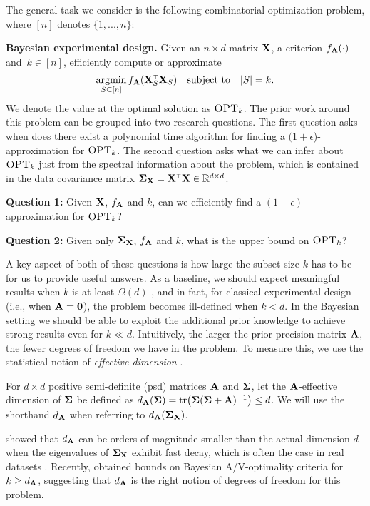 \documentclass[thesis.tex]{subfiles}
\begin{document}
The general task we consider is the following combinatorial
optimization problem, where $[n]$
denotes $\{1,...,n\}$:

\textbf{Bayesian experimental design.}
Given an $n\times d$ matrix $\mathbf X$,
a criterion $f_{\mathbf A}(\cdot)$ and~$k\in[n]$,
efficiently compute or approximate
\begin{align*}
\argmin_{S \subseteq [n]} f_{\A}(\X_S^\top\X_S)\quad\text{subject
  to}\quad |S|=k.
\end{align*}
We denote the value at the optimal solution as ${\textsc{OPT}_k}$.
The prior work around this problem can be grouped into two research questions.
The first question asks when does there exist a
polynomial time algorithm for finding a $(1+\epsilon$)-approximation
for ${\textsc{OPT}_k}$.
The second question asks what we can
infer about ${\textsc{OPT}_k}$ just from the spectral
information about the problem, which is contained in the data covariance matrix
$\Sigmab_\X=\X^\top\X\in\R^{d\times d}$.


\textbf{Question 1:} \quad
Given $\mathbf X$, $f_{\mathbf A}$ and $k$, can we efficiently find a $(1+\epsilon)$-approximation for
${\textsc{OPT}_k}$?

\textbf{Question 2:} \quad
Given only $\mathbf{\Sigma}_{\mathbf X}$, $f_{\mathbf A}$ and $k$,
what is the upper bound on ${\textsc{OPT}_k}$?


A key aspect of both of these questions is how large the subset
size $k$ has to be for us to provide useful answers. As a baseline, we
should expect meaningful results when $k$ is at least $\Omega(d)$ \citep[see
discussion in][]{near-optimal-design}, and in fact,
for classical experimental design (i.e., when $\mathbf A=\mathbf 0$), the problem
becomes ill-defined 
when $k<d$. In the Bayesian setting we should be able to exploit the
additional prior knowledge 
to achieve strong results even for $k\ll d$. Intuitively, the larger
the prior precision matrix $\mathbf A$, the fewer degrees of freedom we have
in the problem. To measure this, we use the statistical notion of
\emph{effective dimension} \citep{ridge-leverage-scores}.
\begin{definition}
For $d\times d$ positive semi-definite (psd) matrices $\mathbf A$ and $\mathbf{\Sigma}$,
  let the $\mathbf A$-effective dimension of $\mathbf{\Sigma}$
be defined as $d_{\mathbf A}(\mathbf{\Sigma}) =
\mathrm{tr}\big(\mathbf{\Sigma}(\mathbf{\Sigma}+\mathbf A)^{-1}\big) \leq d$.
We will use the shorthand $d_{\mathbf A}$ when referring to $d_{\mathbf A}(\mathbf{\Sigma}_{\mathbf X})$.
\end{definition}
\cite{klivans-goel17} showed that $d_\mathbf A$ can be orders of
  magnitude smaller than the 
actual dimension $d$ when the eigenvalues of $\mathbf{\Sigma}_\mathbf X$ exhibit fast
decay, which is often the case in real datasets
\citep{revisiting-nystrom}. Recently,
\cite{regularized-volume-sampling} obtained bounds on Bayesian 
A/V-optimality criteria for $k\geq d_{\mathbf A}$, suggesting that $d_{\mathbf A}$
is the right notion of degrees of freedom for this problem.
\end{document}
